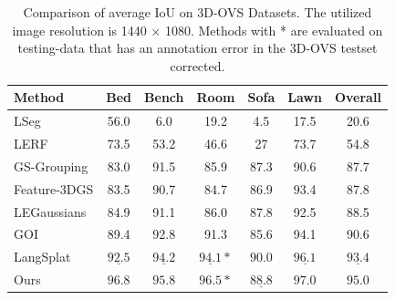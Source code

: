 \begin{table}[t]
    \centering
    \footnotesize
    \begin{tabular}{lcccccc}
        \toprule
        \hspace{-2pt}\textbf{Method}\hspace{-2pt} &
        \hspace{-2pt}\textbf{Bed}\hspace{-2pt} &
        \hspace{-2pt}\textbf{Bench}\hspace{-2pt} &
        \hspace{-2pt}\textbf{Room}\hspace{-2pt} &
        \hspace{-2pt}\textbf{Sofa}\hspace{-2pt} &
        \hspace{-2pt}\textbf{Lawn}\hspace{-2pt} &
        \hspace{-2pt}\textbf{Overall}\hspace{-2pt}\\
        \midrule
        \hspace{-2pt}LSeg & 56.0 & 6.0 & 19.2 & 4.5 & 17.5 & 20.6\\
        \hspace{-2pt}LERF & 73.5 & 53.2 & 46.6 & 27 & 73.7 & 54.8\\
        \hspace{-2pt}GS-Grouping & 83.0 & 91.5 & 85.9 & 87.3 & 90.6 & 87.7\\
        \hspace{-2pt}Feature-3DGS\hspace{-3pt} & 83.5 & 90.7 & 84.7 & 86.9 & 93.4 & 87.8\\
        \hspace{-2pt}LEGaussians & 84.9 & 91.1 & 86.0 & 87.8 & 92.5 & 88.5\\
        \hspace{-2pt}GOI & 89.4 & 92.8 & 91.3 & 85.6 & 94.1 & 90.6\\
        \hspace{-2pt}LangSplat & $\underline{92.5}$ & $\underline{94.2}$ & $\underline{94.1}*$ & $\mathbf{90.0}$ & $\underline{96.1}$ & $\underline{93.4}$\\
        Ours & $\mathbf{96.8}$ & $\mathbf{95.8}$ & $\mathbf{96.5}*$ & $\underline{88.8}$ & $\mathbf{97.0}$ & $\mathbf{95.0}$\\
        \bottomrule
    \end{tabular}
    \caption{Comparison of average IoU on 3D-OVS Datasets. The utilized image resolution is 1440 $\times$ 1080. Methods with * are evaluated on testing-data that has an annotation error in the 3D-OVS testset corrected.}
    \label{tab:3dovs-mIoU}
\end{table}